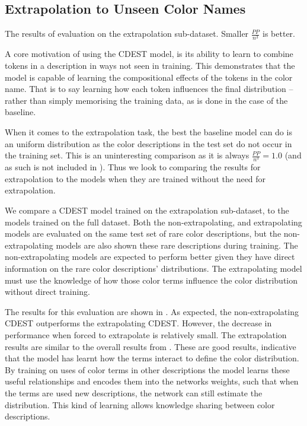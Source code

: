 \documentclass[11pt,a4paper]{article}
\begin{document}
\subsection{Extrapolation to Unseen Color Names}

\begin{table}
	\centering
	\caption{\label{tblresextrapo} The results of evaluation on the extrapolation sub-dataset. Smaller $\frac{PP}{n^3}$ is better.}
\end{table}


A core motivation of using the CDEST model, is its ability to learn to combine tokens in a description in ways not seen in training.
This demonstrates that the model is capable of learning the compositional effects of the tokens in the color name.
That is to say learning how each token influences the final distribution -- rather than simply memorising the training data, as is done in the case of the baseline.

When it comes to the extrapolation task, the best the baseline model can do is an uniform distribution as the color descriptions in the test set do not occur in the training set.
This is an uninteresting comparison as it is always $\frac{PP}{n^3}=1.0$ (and as such is not included in ).
Thus we look to comparing the results for extrapolation to the models when they are trained without the need for extrapolation.

We compare a CDEST model trained on the extrapolation sub-dataset, to the models trained on the full dataset.
Both the non-extrapolating, and extrapolating models are evaluated on the same test set of rare color descriptions,
but the non-extrapolating models are also shown these rare descriptions during training.
The non-extrapolating models are expected to perform better given they have direct information on the rare color descriptions' distributions.
The extrapolating model must use the knowledge of how those color terms influence the color distribution without direct training.

The results for this evaluation are shown in .
As expected, the non-extrapolating CDEST outperforms the extrapolating CDEST.
However, the decrease in performance when forced to extrapolate is relatively small.
The extrapolation results are similar to the overall results from .
These are good results, indicative that the model has learnt how the terms interact to define the color distribution.
By training on uses of color terms in other descriptions the model learns these useful relationships and encodes them into the networks weights, such that when the terms are used new descriptions, the network can still estimate the distribution.
This kind of learning allows knowledge sharing between color descriptions.
\end{document}
